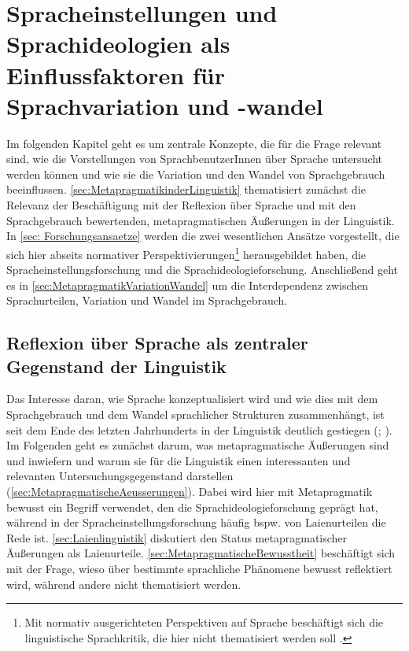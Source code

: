 \chapter[Spracheinstellungen und Sprachideologien]{Spracheinstellungen und Sprachideologien als Einflussfaktoren für Sprachvariation und -wandel}
\label{cha:SprachideologienundSpracheinstellungen}
Im folgenden Kapitel geht es um zentrale Konzepte, die für die Frage relevant sind, wie die Vorstellungen von SprachbenutzerInnen über Sprache untersucht werden können und wie sie die Variation und den Wandel von Sprachgebrauch beeinflussen. 
\autoref{sec:MetapragmatikinderLinguistik} thematisiert zunächst die Relevanz der Beschäftigung mit der {Re\-flexion} über Sprache und mit den Sprachgebrauch bewertenden, metapragmatischen Äußerungen in der Linguistik. 
In \autoref{sec: Forschungsansaetze} werden die zwei wesentlichen Ansätze vorgestellt, die sich hier abseits normativer Perspektivierungen\footnote{Mit normativ ausgerichteten Perspektiven auf Sprache beschäftigt sich die linguistische Sprachkritik, die hier nicht thematisiert werden soll \citep[s. bspw.][]{Kilian2010}.} herausgebildet haben, die Spracheinstellungsforschung und die Sprachideologieforschung. 
Anschließend geht es in \autoref{sec:MetapragmatikVariationWandel} um die Interdependenz zwischen Sprachurteilen, Variation und Wandel im Sprachgebrauch. 
\section{Reflexion über Sprache als zentraler Gegenstand der Linguistik}
\label{sec:MetapragmatikinderLinguistik}
Das Interesse daran, wie Sprache konzeptualisiert wird und wie dies mit dem Sprachgebrauch und dem Wandel sprachlicher Strukturen zusammenhängt, ist seit dem Ende des letzten Jahrhunderts in der Linguistik deutlich gestiegen (\citealp[s. etwa][5--6]{Jaworski.2004}; \citealp[119]{Garrett.2007}). 
Im Folgenden geht es zunächst darum, was metapragmatische Äußerungen sind und inwiefern und warum sie für die Linguistik einen interessanten und relevanten Untersuchungsgegenstand darstellen (\autoref{sec:MetapragmatischeAeusserungen}). 
Dabei wird hier mit Metapragmatik bewusst ein Begriff verwendet, den die Sprachideologieforschung geprägt hat, während in der Spracheinstellungsforschung häufig bspw. von Laienurteilen die Rede ist. 
\autoref{sec:Laienlinguistik} diskutiert den  Status metapragmatischer Äußerungen als \glqq Laienurteile\grqq. \autoref{sec:MetapragmatischeBewusstheit} beschäftigt sich mit der Frage, wieso über bestimmte sprachliche Phänomene bewusst reflektiert wird, während andere nicht thematisiert werden.
